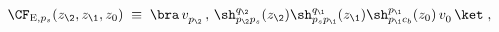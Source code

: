 \begin{equation}
\CF_{{\rm E},p_s}(z_\2,z_\1,z_0)\;\equiv\;\bra\, v_{p_\2}^{}\, ,\,
\sh_{p_\2p_s}^{q_\2}(z_\2)
\sh_{p_sp_\1}^{q_\1}(z_\1)
\sh_{p_\1c_b}^{p_\1}(z_0)\,v_0^{}\,\ket\;,
\end{equation}

